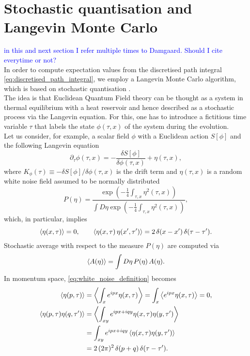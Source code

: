\section{Stochastic quantisation and Langevin Monte Carlo}
\textcolor{blue}{in this and next section I refer multiple times to Damgaard. Should I cite everytime or not?}\\ 
In order to compute expectation values from the discretised path integral \eqref{eq:discretised_path_integral}, we employ a Langevin Monte Carlo algorithm, which is based on stochastic quantisation \cite{ParisiWu, Damgaard1987StochasticQuantization}. \\
The idea is that Euclidean Quantum Field theory can be thought as a system in thermal equilibrium with a heat reservoir and hence described as a stochastic process via the Langevin equation. For this, one has to introduce a fictitious time variable $\tau$ that labels the state $\phi(\tau, x)$ of the system 
during the evolution. \\
Let us consider, for example, a scalar field $\phi$ with a Euclidean action $S[\phi]$ and the following Langevin equation
\begin{equation}
    \partial_\tau \phi(\tau, x) = - \frac{\delta S[\phi]}{\delta \phi (\tau, x)} + \eta (\tau, x),
    \label{eq:Langevin_scalar_full}
\end{equation}
where $K_{\phi}(\tau) \equiv -\delta S[\phi]/\delta \phi (\tau, x)$ is the drift term and $\eta (\tau, x)$ is a random white noise field assumed to be normally distributed
\begin{equation*}
    P(\eta) = \frac{\exp\left(-\frac{1}{4}\int_{\tau,x} \eta^2(\tau, x)\right)}{\int D\eta \exp\left(-\frac{1}{4}\int_{\tau,x} \eta^2(\tau,x)\right)},
\end{equation*} 
which, in particular, implies
\begin{equation}
    \left\langle \eta(x,\tau) \right\rangle = 0, \qquad \left\langle \eta(x,\tau) \, \eta(x',\tau') \right\rangle = 2 \, \delta(x - x') \, \delta (\tau - \tau').
    \label{eq:white_noise_definition}
\end{equation}
Stochastic average with respect to the measure $P(\eta)$ are computed via 
\begin{equation*}
    \left\langle A(\eta) \right\rangle = \int D\eta \, P(\eta) \, A(\eta).
\end{equation*}
In momentum space, \eqref{eq:white_noise_definition} becomes
\begin{equation}
    \begin{aligned}
        \left\langle \eta(p,\tau) \right\rangle &= \left\langle \int_x e^{ipx}\eta(x,\tau) \right\rangle = \int_x \left\langle e^{ipx}\eta(x,\tau) \right\rangle = 0, \\
        \left\langle \eta(p,\tau)\eta(q,\tau') \right\rangle &= \left\langle \int_{xy} e^{ipx + iqy} \eta(x,\tau)\eta(y,\tau') \right\rangle \\
        &= \int_{xy} e^{ipx + iqy} \left\langle \eta(x,\tau)\eta(y,\tau') \right\rangle \\
        &= 2 \, (2\pi)^2 \, \delta(p + q) \, \delta(\tau - \tau').
    \end{aligned}
    \label{eq:white_noise_definition_momentum}
\end{equation}
